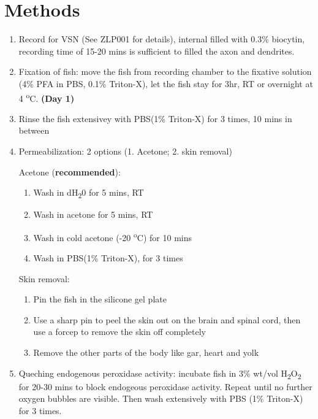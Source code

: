 \documentclass[11pt]{article}
\begin{document}
\section{Methods}
	\begin{enumerate}[label=(\alph*)]
		\item Record for VSN (See ZLP001 for details), internal filled with 0.3\% biocytin, recording time of 15-20 mins is sufficient to filled the axon and dendrites.

		\item Fixation of fish: move the fish from recording chamber to the fixative solution (4\% PFA in PBS, 0.1\% Triton-X), let the fish stay for 3hr, RT or overnight at 4 \textsuperscript{o}C. \textbf{(Day 1)}
			
		\item Rinse the fish extensivey with PBS(1\% Triton-X) for 3 times, 10 mins in between
		
		\item Permeabilization: 2 options (1. Acetone; 2. skin removal)
				
				Acetone (\textbf{recommended}):
				\begin{enumerate}[label=\arabic*.]
				\item Wash in dH\textsubscript{2}0 for 5 mins, RT
				\item Wash in acetone for 5 mins, RT
				\item Wash in cold acetone (-20 \textsuperscript{o}C) for 10 mins
				\item Wash in PBS(1\% Triton-X), for 3 times
				\end{enumerate}
		
				Skin removal:
				\begin{enumerate}[label=\arabic*.]
				\item Pin the fish in the silicone gel plate
				\item Use a sharp pin to peel the skin out on the brain and spinal cord, then use a forcep to remove the skin off completely
				\item Remove the other parts of the body like gar, heart and yolk
				\end{enumerate}
		\item Queching endogenous peroxidase activity:  incubate fish in 3\% wt/vol H\textsubscript{2}O\textsubscript{2} for 20-30 mins to block endogeous peroxidase activity. Repeat until no further oxygen bubbles are visible. Then wash extensively with PBS (1\% Triton-X) for 3 times.


\end{enumerate}
\end{document}

